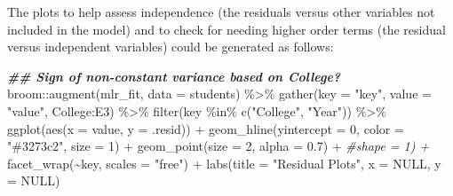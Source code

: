 \documentclass[
]{book}
\newenvironment{Shaded}{\begin{snugshade}}{\end{snugshade}}
\newcommand{\AttributeTok}[1]{\textcolor[rgb]{0.77,0.63,0.00}{#1}}
\newcommand{\CommentTok}[1]{\textcolor[rgb]{0.56,0.35,0.01}{\textit{#1}}}
\newcommand{\ConstantTok}[1]{\textcolor[rgb]{0.00,0.00,0.00}{#1}}
\newcommand{\DecValTok}[1]{\textcolor[rgb]{0.00,0.00,0.81}{#1}}
\newcommand{\DocumentationTok}[1]{\textcolor[rgb]{0.56,0.35,0.01}{\textbf{\textit{#1}}}}
\newcommand{\FloatTok}[1]{\textcolor[rgb]{0.00,0.00,0.81}{#1}}
\newcommand{\FunctionTok}[1]{\textcolor[rgb]{0.00,0.00,0.00}{#1}}
\newcommand{\NormalTok}[1]{#1}
\newcommand{\OtherTok}[1]{\textcolor[rgb]{0.56,0.35,0.01}{#1}}
\newcommand{\SpecialCharTok}[1]{\textcolor[rgb]{0.00,0.00,0.00}{#1}}
\newcommand{\StringTok}[1]{\textcolor[rgb]{0.31,0.60,0.02}{#1}}
\begin{document}
The plots to help assess independence (the residuals versus other variables not included in the model) and to check for needing higher order terms (the residual versus independent variables) could be generated as follows:

\begin{Shaded}
\end{Shaded}

\begin{Shaded}
\begin{Highlighting}[]
\DocumentationTok{\#\# Sign of non{-}constant variance based on College?}
\NormalTok{broom}\SpecialCharTok{::}\FunctionTok{augment}\NormalTok{(mlr\_fit, }\AttributeTok{data =}\NormalTok{ students) }\SpecialCharTok{\%\textgreater{}\%} 
  \FunctionTok{gather}\NormalTok{(}\AttributeTok{key =} \StringTok{"key"}\NormalTok{, }\AttributeTok{value =} \StringTok{"value"}\NormalTok{, College}\SpecialCharTok{:}\NormalTok{E3) }\SpecialCharTok{\%\textgreater{}\%} 
  \FunctionTok{filter}\NormalTok{(key }\SpecialCharTok{\%in\%} \FunctionTok{c}\NormalTok{(}\StringTok{"College"}\NormalTok{, }\StringTok{"Year"}\NormalTok{)) }\SpecialCharTok{\%\textgreater{}\%} 
  \FunctionTok{ggplot}\NormalTok{(}\FunctionTok{aes}\NormalTok{(}\AttributeTok{x =}\NormalTok{ value, }\AttributeTok{y =}\NormalTok{ .resid)) }\SpecialCharTok{+} 
  \FunctionTok{geom\_hline}\NormalTok{(}\AttributeTok{yintercept =} \DecValTok{0}\NormalTok{, }\AttributeTok{color =} \StringTok{"\#3273c2"}\NormalTok{, }\AttributeTok{size =} \DecValTok{1}\NormalTok{) }\SpecialCharTok{+}
  \FunctionTok{geom\_point}\NormalTok{(}\AttributeTok{size =} \DecValTok{2}\NormalTok{, }\AttributeTok{alpha =} \FloatTok{0.7}\NormalTok{) }\SpecialCharTok{+} \CommentTok{\#shape = 1) +}
  \FunctionTok{facet\_wrap}\NormalTok{(}\SpecialCharTok{\textasciitilde{}}\NormalTok{key, }\AttributeTok{scales =} \StringTok{"free"}\NormalTok{) }\SpecialCharTok{+}
  \FunctionTok{labs}\NormalTok{(}\AttributeTok{title =} \StringTok{"Residual Plots"}\NormalTok{, }
       \AttributeTok{x =} \ConstantTok{NULL}\NormalTok{, }
       \AttributeTok{y =} \ConstantTok{NULL}\NormalTok{)}
\end{Highlighting}
\end{Shaded}
\end{document}
